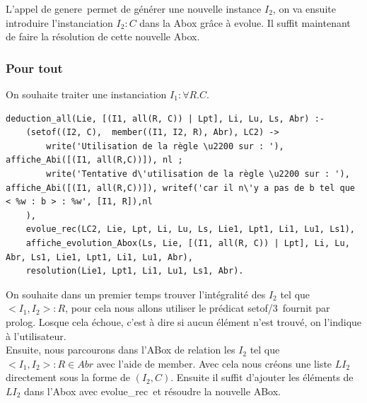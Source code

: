\documentclass{article}
\begin{document}
L'appel de \color{blue}genere\color{black}\ permet de générer une nouvelle instance $I_2$, on va ensuite introduire l'instanciation $I_2:C$ dans la Abox grâce à \color{blue}evolue\color{black}. Il suffit maintenant de faire la résolution de cette nouvelle Abox.

\subsubsection{Pour tout}

On souhaite traiter une instanciation $I_1:\forall R.C$.
\begin{verbatim}
deduction_all(Lie, [(I1, all(R, C)) | Lpt], Li, Lu, Ls, Abr) :-
	(setof((I2, C),  member((I1, I2, R), Abr), LC2) -> 
		write('Utilisation de la règle \u2200 sur : '), affiche_Abi([(I1, all(R,C))]), nl ;
		write('Tentative d\'utilisation de la règle \u2200 sur : '), affiche_Abi([(I1, all(R,C))]), writef('car il n\'y a pas de b tel que < %w : b > : %w', [I1, R]),nl
	),
	evolue_rec(LC2, Lie, Lpt, Li, Lu, Ls, Lie1, Lpt1, Li1, Lu1, Ls1),
	affiche_evolution_Abox(Ls, Lie, [(I1, all(R, C)) | Lpt], Li, Lu, Abr, Ls1, Lie1, Lpt1, Li1, Lu1, Abr), 
	resolution(Lie1, Lpt1, Li1, Lu1, Ls1, Abr).
\end{verbatim}

On souhaite dans un premier temps trouver l'intégralité des $I_2$ tel que $<I_1,I_2>:R$, pour cela nous allons utiliser le prédicat \color{blue}setof/3\color{black}\ fournit par prolog. Losque cela échoue, c'est à dire si aucun élément n'est trouvé, on l'indique à l'utilisateur.\\
Ensuite, nous parcourons dans l'ABox de relation les $I_2$ tel que $<I_1,I_2>:R\in Abr$ avec l'aide de \color{blue}member\color{black}. Avec cela nous créons une liste $LI_2$ directement sous la forme de $(I_2,C)$. Ensuite il suffit d'ajouter les éléments de $LI_2$ dans l'Abox avec \color{blue}evolue\_rec\color{black}\ et résoudre la nouvelle ABox.\\
\end{document}
